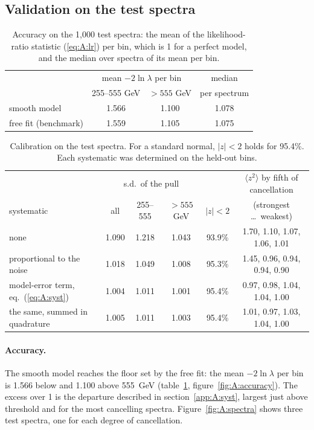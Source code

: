 \subsection{Validation on the test spectra}
\label{app:A:validation}

\begin{table}[!htbp]
\centering
\small
\begin{tabular}{lccc}
\toprule
 & \multicolumn{2}{c}{mean $-2\ln\lambda$ per bin} & median \\
 & 255--555 GeV & $>555$ GeV & per spectrum \\
\midrule
smooth model                 & 1.566 & 1.100 & 1.078 \\
free fit (benchmark)         & 1.559 & 1.105 & 1.075 \\
\bottomrule
\end{tabular}
\caption{Accuracy on the 1,000 test spectra: the mean of the likelihood-ratio statistic (\ref{eq:A:lr}) per bin,
which is 1 for a perfect model, and the median over spectra of its mean per bin.}
\label{tab:A:accuracy}
\end{table}

\begin{table}[!htbp]
\centering
\small
\setlength{\tabcolsep}{3.5pt}
\begin{tabular}{lccccc}
\toprule
 & \multicolumn{3}{c}{s.d.\ of the pull} & & $\langle z^2\rangle$ by fifth of cancellation\\
systematic & all & 255--555 & $>555$ GeV & $|z|<2$ & (strongest \dots\ weakest)\\
\midrule
none                                     & 1.090 & 1.218 & 1.043 & 93.9\% & 1.70, 1.10, 1.07, 1.06, 1.01\\
proportional to the noise                & 1.018 & 1.049 & 1.008 & 95.3\% & 1.45, 0.96, 0.94, 0.94, 0.90\\
model-error term, eq.~(\ref{eq:A:syst})  & 1.004 & 1.011 & 1.001 & 95.4\% & 0.97, 0.98, 1.04, 1.04, 1.00\\
the same, summed in quadrature           & 1.005 & 1.011 & 1.003 & 95.4\% & 1.01, 0.97, 1.03, 1.04, 1.00\\
\bottomrule
\end{tabular}
\caption{Calibration on the test spectra. For a standard normal, $|z|<2$ holds for 95.4\%. Each systematic was
determined on the held-out bins.}
\label{tab:A:calibration}
\end{table}

\paragraph{Accuracy.} The smooth model reaches the floor set by the free fit: the mean $-2\ln\lambda$ per bin is
1.566 below and 1.100 above 555~GeV (table~\ref{tab:A:accuracy}, figure~\ref{fig:A:accuracy}). The excess over 1 is
the departure described in section~\ref{app:A:syst}, largest just above threshold and for the most cancelling
spectra. Figure~\ref{fig:A:spectra} shows three test spectra, one for each degree of cancellation.

